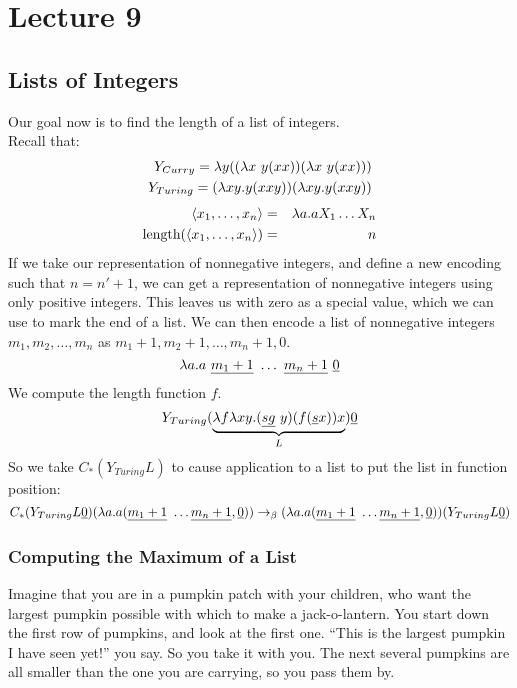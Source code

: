 \chapter{Lecture 9}
\pagestyle{fancy}

\section{Lists of Integers}
Our goal now is to find the length of a list of integers.\\
Recall that:
\begin{eqnarray*}
  Y_{Curry} = \lambda y((\lambda x\ y(xx))(\lambda x\ y(xx)))\\
  Y_{Turing} = (\lambda xy . y(xxy))(\lambda xy . y(xxy))\\
\end{eqnarray*}
\begin{eqnarray*}
  \langle x_1,\ldots,x_n \rangle &=& \lambda a . aX_1\ldots X_n\\
  \hbox{length}(\langle x_1,\ldots,x_n \rangle ) &=& n\\
\end{eqnarray*}
If we take our representation of nonnegative integers, and define a new encoding such that $n = n' + 1$, we can get a representation of nonnegative integers using only positive integers. This leaves us with zero as a special value, which we can use to mark the end of a list. We can then encode a list of nonnegative integers $m_1,m_2,\ldots,m_n$ as $m_1+1,m_2+1,\ldots,m_n+1,0$.\\

\begin{equation*}
  \l a . a\ \uline{m_1+1}\ \ldots\ \uline{m_n+1}\ \uline{0}
\end{equation*}
We compute the length function $f$.
\begin{equation*}
  Y_{Turing}(\underbrace{\l f \l xy. (\uline{sg}\ y)(f(\uline{s}x))x}_{L})\uline{0}
\end{equation*}
So we take $C_*(Y_{Turing}L)$ to cause application to a list to put the list in function position:
\begin{equation*}
  C_*(Y_{Turing}L\uline{0})(\l a . a(\uline{m_1+1}\ \ldots \uline{m_n+1}, \uline{0})) \rightarrow_\beta (\l a . a(\uline{m_1+1}\ \ldots \uline{m_n+1}, \uline{0}))(Y_{Turing}L\uline{0})
\end{equation*}
\subsection{Computing the Maximum of a List}
Imagine that you are in a pumpkin patch with your children, who want the largest pumpkin possible with which to make a jack-o-lantern. You start down the first row of pumpkins, and look at the first one. ``This is the largest pumpkin I have seen yet!'' you say. So you take it with you. The next several pumpkins are all smaller than the one you are carrying, so you pass them by.\\


